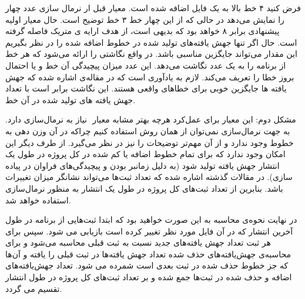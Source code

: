 فرض کنید ۴ خط بالا به یک فایل اضافه شده است. معیار   قبل ار نرمال سازی عدد چهار را نمایش می‌دهد در حالی که از این چهار خط ۳ خط توضیح است. حال معیار اولیه پیشنهادی برابر ۸ خواهد بود که بدیهی است، از هدف ارايه ی متریک فاصله گرفته است. حال اگر تنها جهش یافته‌های تولید شده در خطوط اضافه شده را در نظر بگیریم این مقدار می‌تواند جایگزین مناسبی باشد. در‌ واقع نگاشتی را ارائه می‌شود که هر خط از برنامه را به یک عدد نگاشت می‌دهد. این عدد میزان پیچیدگی آن خط و یا احتمال بروز خطا را تعریف می‌کند.  لازم به یادآوری است که در مقاله‌ی  \cite{just2014mutants} اشاره شده که جهش یافته ها جایگزین خوبی برای خطاهای واقعی هستند. این نگاشت برابر است با تعداد جهش یافته های تولید شده در آن خط.

مشکل دوم: این معیار برای عمل‌کرد هرچه بهتر مشابه معیار  ‌ نیاز به نرمال‌سازی دارد. به جهت نرمال‌سازی نمی‌توان از همان روش استفاده کنیم چراکه در آن وزن دهی به خطوط وجود ندارد و از آن مهم‌تر توضیحات را نیز در نظر می‌گیرد. از طرف دیگر این امکان وجود ندارد که برای تمام خطوط اضافه یا کم شده در کل پروژه در طول یک انتشار جهش یافته تولید شود (به دلیل زمانبر بودن و پیچیدگی‌های فراوان در پیاده سازی). در مقالات گذشته اشاره شده که تعداد ثبت‌ها می‌تواند نشانگر میزان تغییرات باشد. بنابرین از تعداد ثبت‌های کل پروژه در طول یک انتشار به منظور نرمال‌سازی استفاده خواهد شد.

در نهایت نحوه‌ی محاسبه به این صورت خواهید بود که ابتدا ثبت‌هایی از برنامه در طول آخرین انتشار که در آن فایل مورد نظر تغییر کرده است بازیابی می شود. سپس برای هر ثبت تعداد جهش یافته‌های جدید نسبت به ثبت قبلی محاسبه می‌شود و برای محاسبه‌ی جهش‌یافته‌های حذف شده تعداد جهش یافته‌ها در  ثبت قبلی را یافته و آن‌ها که جز خطوط حذف شده در ثبت بعدی است شمرده می شود. تعداد جهش‌یافته‌های اضافه و حذف شده در ثبت‌ها جمع شده و بر تعداد ثبت‌های کل پروژه در طول انتشار تقسیم می گردد.





